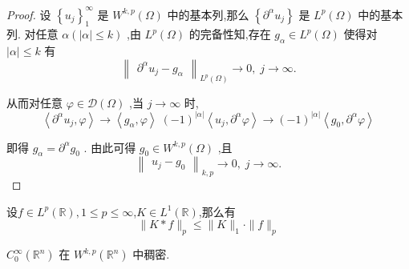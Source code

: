 \documentclass[lang=cn,newtx,10pt,scheme=chinese,thmcnt=chapter]{elegantbook}
\begin{document}
\begin{proof}
    设 \({\left\{  {u}_{j}\right\}  }_{1}^{\infty }\) 是 \({W}^{k,p}\left( \Omega \right)\) 中的基本列,那么 \(\left\{  {{\partial }^{\alpha }{u}_{j}}\right\}\) 是 \({L}^{p}\left( \Omega \right)\) 中的基本列. 对任意 \(\alpha \left( {\left| \alpha \right|  \leqslant  k}\right)\) ,由 \({L}^{p}\left( \Omega \right)\) 的完备性知,存在 \({g}_{\alpha } \in  {L}^{p}\left( \Omega \right)\) 使得对 \(\left| \alpha \right|  \leqslant  k\) 有
\begin{equation*}
{\begin{Vmatrix}{\partial }^{\alpha }{u}_{j} - {g}_{\alpha }\end{Vmatrix}}_{{L}^{p}\left( \Omega \right) } \rightarrow  0,\;j \rightarrow  \infty .
\end{equation*}

从而对任意 \(\varphi  \in  \mathcal{D}\left( \Omega \right)\) ,当 \(j \rightarrow  \infty\) 时,
\begin{equation*}
\left\langle  {{\partial }^{\alpha }{u}_{j},\varphi }\right\rangle\to 
\left\langle  {{g}_{\alpha },\varphi }\right\rangle  \;   {\left( -1\right) }^{\left| \alpha \right| }\left\langle  {{u}_{j},{\partial }^{\alpha }\varphi }\right\rangle\to{\left( -1\right) }^{\left| \alpha \right| }\left\langle  {{g}_{0},{\partial }^{\alpha }\varphi }\right\rangle  
\end{equation*}

即得 \({g}_{\alpha } = {\partial }^{\alpha }{g}_{0}\) . 由此可得 \({g}_{0} \in  {W}^{k,p}\left( \Omega \right)\) ,且
\begin{equation*}
{\begin{Vmatrix}{u}_{j} - {g}_{0}\end{Vmatrix}}_{k,p} \rightarrow  0,\;j \rightarrow  \infty .
\end{equation*}

\end{proof}
\begin{proposition}
    [Young不等式]
    设$f\in L^p(\mathbb{R}),1\leqslant p\leqslant \infty$,$K\in L^1(\mathbb{R})$,那么有
    \begin{equation*}
        \|K*f\|_p\leqslant \|K\|_1\cdot \|f\|_p
    \end{equation*}
\end{proposition}
\begin{theorem}
    \({C}_{0}^{\infty }\left( {\mathbb{R}}^{n}\right)\) 在 \({W}^{k,p}\left( {\mathbb{R}}^{n}\right)\) 中稠密.
\end{theorem}
\end{document}
